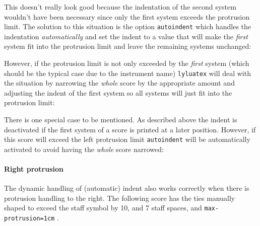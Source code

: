 \documentclass{lyluatexexample}
\begin{document}
This doesn't really look good because the indentation of the second system
wouldn't have been necessary since only the first system exceeds the protrusion
limit. The solution to this situation is the option \texttt{autoindent} which
handles the indentation \emph{automatically} and set the indent to a value that
will make the \emph{first} system fit into the protrusion limit and leave the
remaining systems unchanged:



However, if the protrusion limit is not only exceeded by the \emph{first} system
(which should be the typical case due to the instrument name) \texttt{lyluatex}
will deal with the situation by narrowing the \emph{whole} score by the
appropriate amount and adjusting the indent of the first system so all systems
will just fit into the protrusion limit:


There is one special case to be mentioned. As described above the indent is
deactivated if the first system of a score is printed at a later position.
However, if this score will exceed the left protrusion limit \texttt{autoindent}
will be automatically activated to avoid having the \emph{whole} score narrowed:


\paragraph{Right protrusion}
The dynamic handling of (automatic) indent also works correctly when there is
protrusion handling to the right. The following score has the ties manually
shaped to exceed the staff symbol by 10, and 7 staff spaces, and
\texttt{max-protrusion=1cm} .

\end{document}
